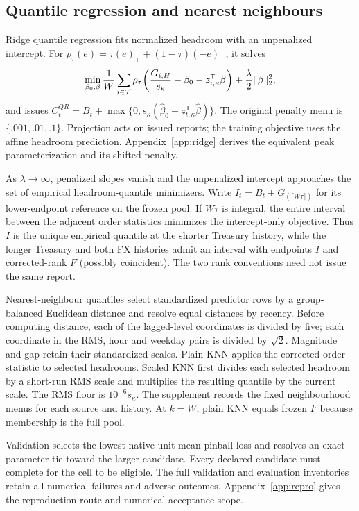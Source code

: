 \subsection{Quantile regression and nearest neighbours}
Ridge quantile regression fits normalized headroom with an unpenalized intercept. For $\rho_\tau(e)=\tau(e)_++(1-\tau)(-e)_+$, it solves
\begin{equation}\label{eq:qr}
\min_{\beta_0,\beta}\frac1W\sum_{i\in\mathcal T}\rho_\tau\!\left(\frac{G_{i,H}}{s_\kappa}-\beta_0-z_{i,\kappa}^{\mathsf T}\beta\right)+\frac\lambda2\|\beta\|_2^2,
\end{equation}
and issues $C_t^{QR}=B_t+\max\{0,s_\kappa(\widehat\beta_0+z_{t,\kappa}^{\mathsf T}\widehat\beta)\}$. The original penalty menu is $\{.001,.01,.1\}$. Projection acts on issued reports; the training objective uses the affine headroom prediction. Appendix~\ref{app:ridge} derives the equivalent peak parameterization and its shifted penalty.

As $\lambda\to\infty$, penalized slopes vanish and the unpenalized intercept approaches the set of empirical headroom-quantile minimizers. Write $I_t=B_t+G_{(\lceil W\tau\rceil)}$ for its lower-endpoint reference on the frozen pool. If $W\tau$ is integral, the entire interval between the adjacent order statistics minimizes the intercept-only objective. Thus $I$ is the unique empirical quantile at the shorter Treasury history, while the longer Treasury and both FX histories admit an interval with endpoints $I$ and corrected-rank $F$ (possibly coincident). The two rank conventions need not issue the same report.

Nearest-neighbour quantiles select standardized predictor rows by a group-balanced Euclidean distance and resolve equal distances by recency. Before computing distance, each of the lagged-level coordinates is divided by five; each coordinate in the RMS, hour and weekday pairs is divided by $\sqrt{2}$. Magnitude and gap retain their standardized scales. Plain KNN applies the corrected order statistic to selected headrooms. Scaled KNN first divides each selected headroom by a short-run RMS scale and multiplies the resulting quantile by the current scale. The RMS floor is $10^{-6}s_\kappa$. The supplement records the fixed neighbourhood menus for each source and history. At $k=W$, plain KNN equals frozen $F$ because membership is the full pool.

Validation selects the lowest native-unit mean pinball loss and resolves an exact parameter tie toward the larger candidate. Every declared candidate must complete for the cell to be eligible. The full validation and evaluation inventories retain all numerical failures and adverse outcomes. Appendix~\ref{app:repro} gives the reproduction route and numerical acceptance scope.

